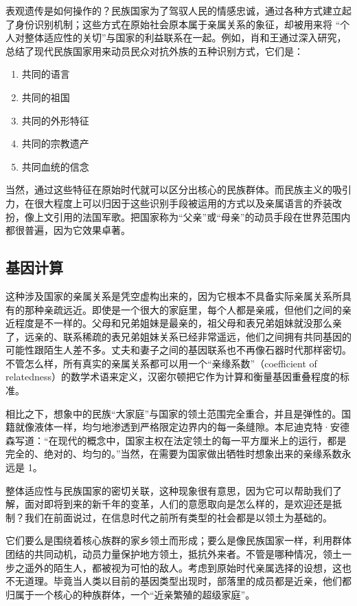 表观遗传是如何操作的？民族国家为了驾驭人民的情感忠诚，通过各种方式建立起了身份识别机制；这些方式在原始社会原本属于亲属关系的象征，却被用来将 “个人对整体适应性的关切”与国家的利益联系在一起。例如，肖和王通过深入研究，总结了现代民族国家用来动员民众对抗外族的五种识别方式，它们是：
\begin{enumerate}
    \item 共同的语言
    \item 共同的祖国
    \item 共同的外形特征
    \item 共同的宗教遗产
    \item 共同血统的信念
\end{enumerate}

当然，通过这些特征在原始时代就可以区分出核心的民族群体。而民族主义的吸引力，在很大程度上可以归因于这些识别手段被运用的方式以及亲属语言的乔装改扮，像上文引用的法国军歌。把国家称为“父亲”或“母亲”的动员手段在世界范围内都很普遍，因为它效果卓著。

\subsection{基因计算}
这种涉及国家的亲属关系是凭空虚构出来的，因为它根本不具备实际亲属关系所具有的那种亲疏远近。即使是一个很大的家庭里，每个人都是亲戚，但他们之间的亲近程度是不一样的。父母和兄弟姐妹是最亲的，祖父母和表兄弟姐妹就没那么亲了，远亲的、联系稀疏的表兄弟姐妹关系已经非常遥远，他们之间拥有共同基因的可能性跟陌生人差不多。丈夫和妻子之间的基因联系也不再像石器时代那样密切。不管怎么样，所有真实的亲属关系都可以用一个“亲缘系数”（coefficient of relatedness）的数学术语来定义，汉密尔顿把它作为计算和衡量基因重叠程度的标准。

相比之下，想象中的民族“大家庭”与国家的领土范围完全重合，并且是弹性的。国籍就像液体一样，均匀地渗透到严格限定边界内的每一条缝隙。本尼迪克特·安德森写道：“在现代的概念中，国家主权在法定领土的每一平方厘米上的运行，都是完全的、绝对的、均匀的。”当然，在需要为国家做出牺牲时想象出来的亲缘系数永远是 1。

整体适应性与民族国家的密切关联，这种现象很有意思，因为它可以帮助我们了解，面对即将到来的新千年的变革，人们的意愿取向是怎么样的，是欢迎还是抵制？我们在前面说过，在信息时代之前所有类型的社会都是以领土为基础的。

它们要么是围绕着核心族群的家乡领土而形成；要么是像民族国家一样，利用群体团结的共同动机，动员力量保护地方领土，抵抗外来者。不管是哪种情况，领土一步之遥外的陌生人，都被视为可怕的敌人。考虑到原始时代亲属选择的设想，这也不无道理。毕竟当人类以目前的基因类型出现时，部落里的成员都是近亲，他们都归属于一个核心的种族群体，一个“近亲繁殖的超级家庭”。

